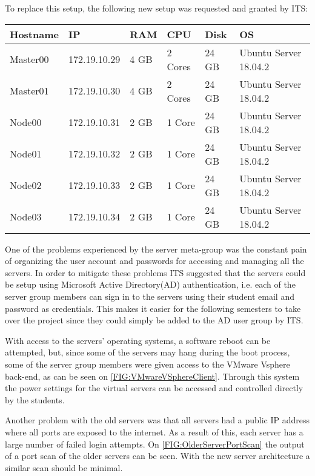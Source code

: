 To replace this setup, the following new setup was requested and granted by ITS:

\begin{table}[H]
\begin{tabular}{|l|l|l|l|l|l|}
\hline
Hostname & IP				& RAM 	& CPU 		& Disk 	& OS 					\\ \hline
Master00 & 172.19.10.29	& 4 GB	& 2 Cores	& 24 GB	& Ubuntu Server 18.04.2	\\ \hline
Master01 & 172.19.10.30	& 4 GB	& 2 Cores	& 24 GB	& Ubuntu Server 18.04.2	\\ \hline			
Node00 	& 172.19.10.31	& 2 GB	& 1 Core		& 24 GB	& Ubuntu Server 18.04.2	\\ \hline
Node01 	& 172.19.10.32	& 2 GB	& 1 Core		& 24 GB	& Ubuntu Server 18.04.2	\\ \hline
Node02 	& 172.19.10.33	& 2 GB	& 1 Core		& 24 GB	& Ubuntu Server 18.04.2	\\ \hline
Node03 	& 172.19.10.34	& 2 GB	& 1 Core		& 24 GB	& Ubuntu Server 18.04.2	\\ \hline
\end{tabular}
\end{table}

One of the problems experienced by the server meta-group was the constant pain of organizing the user account and passwords for accessing and managing all the servers. 
In order to mitigate these problems ITS suggested that the servers could be setup using Microsoft Active Directory(AD) authentication, i.e. each of the server group members can sign in to the servers using their student email and password as credentials. 
This makes it easier for the following semesters to take over the project since they could simply be added to the AD user group by ITS. 

With access to the servers' operating systems, a software reboot can be attempted, but, since some of the servers may hang during the boot process, some of the server group members were given access to the VMware Vsphere back-end, as can be seen on \autoref{FIG:VMwareVSphereClient}. 
Through this system the power settings for the virtual servers can be accessed and controlled directly by the students. 

Another problem with the old servers was that all servers had a public IP address where all ports are exposed to the internet. 
As a result of this, each server has a large number of failed login attempts.
On \autoref{FIG:OlderServerPortScan} the output of a port scan of the older servers can be seen. 
With the new server architecture a similar scan should be minimal. 

